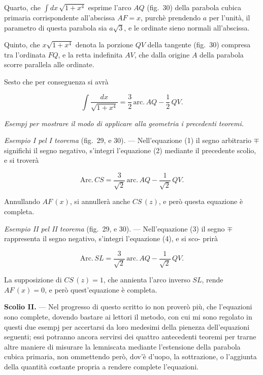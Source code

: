 \documentclass{article}
\begin{document}
Quarto, che $\displaystyle\int dx\,\sqrt{1+x^{4}}$ esprime l'arco $AQ$ (fig.~30) della parabola
cubica primaria corrispondente all'abscissa $AF = x$, purchè prendendo $a$ per l'unità, il
parametro di questa parabola sia $a\sqrt{3}$, e le ordinate sieno normali all'abscissa.


Quinto, che $x\sqrt{1+x^{4}}$ denota la porzione $QV$ della tangente (fig.~30) compresa tra
l'ordinata $FQ$, e la retta indefinita $AV$, che dalla origine $A$ della parabola scorre parallela
alle ordinate.

Sesto che per conseguenza si avrà

\[ \int \frac{dx}{\sqrt{1+x^{4}}} = \frac{3}{2}\,\mathrm{arc.}\,AQ - \frac{1}{2}\,QV. \]

\emph{Esempj per mostrare il modo di applicare alla geometria i precedenti teoremi.}

\emph{Esempio I pel I teorema} (fig.~29, e 30). --- Nell'equazione (1) il segno arbitrario $\mp$
significhi il segno negativo, s'integri l'equazione (2) mediante il precedente scolio, e si
troverà

\[ \mathrm{Arc.}\,CS = \frac{3}{\sqrt{2}}\,\mathrm{arc.}\,AQ - \frac{1}{\sqrt{2}}\,QV. \]

Annullando $AF\,(x)$, si annullerà anche $CS\,(z)$, e però questa equazione è completa.

\emph{Esempio II pel II teorema} (fig.~29, e 30). --- Nell'equazione (3) il segno $\mp$
rappresenta il segno negativo, s'integri l'equazione (4), e si sco-
prirà

\[ \mathrm{Arc.}\,SL = \frac{3}{\sqrt{2}}\,\mathrm{arc.}\,AQ - \frac{1}{\sqrt{2}}\,QV. \]

La supposizione di $CS\,(z) = 1$, che annienta l'arco inverso $SL$, rende $AF\,(x) = 0$, e però
quest'equazione è completa.

\textbf{Scolio II.} --- Nel progresso di questo scritto io non proverò più, che l'equazioni sono
complete, dovendo bastare ai lettori il metodo, con cui mi sono regolato in questi due esempj per
accertarsi da loro medesimi della pienezza dell'equazioni seguenti; essi potranno ancora servirsi
dei quattro antecedenti teoremi per trarne altre maniere di misurare la lemniscata mediante
l'estensione della parabola cubica primaria, non ommettendo però, dov'è d'uopo, la sottrazione, o
l'aggiunta della quantità costante propria a rendere complete l'equazioni.
\end{document}
